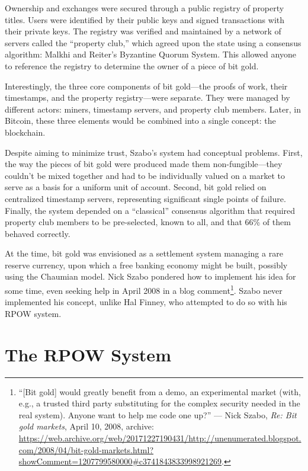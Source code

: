 \documentclass[
  a5paper,
  smalldemyvopaper,10pt,twoside,onecolumn,openright,extrafontsizes,hidelinks]{memoir}
\begin{document}
Ownership and exchanges were secured through a public registry of
property titles. Users were identified by their public keys and signed
transactions with their private keys. The registry was verified and
maintained by a network of servers called the ``property club,'' which
agreed upon the state using a consensus algorithm: Malkhi and Reiter's
Byzantine Quorum System. This allowed anyone to reference the registry
to determine the owner of a piece of bit gold.

Interestingly, the three core components of bit gold---the proofs of
work, their timestamps, and the property registry---were separate. They
were managed by different actors: miners, timestamp servers, and
property club members. Later, in Bitcoin, these three elements would be
combined into a single concept: the blockchain.

Despite aiming to minimize trust, Szabo's system had conceptual
problems. First, the way the pieces of bit gold were produced made them
non-fungible---they couldn't be mixed together and had to be
individually valued on a market to serve as a basis for a uniform unit
of account. Second, bit gold relied on centralized timestamp servers,
representing significant single points of failure. Finally, the system
depended on a ``classical'' consensus algorithm that required property
club members to be pre-selected, known to all, and that 66\% of them
behaved correctly.

At the time, bit gold was envisioned as a settlement system managing a
rare reserve currency, upon which a free banking economy might be built,
possibly using the Chaumian model. Nick Szabo pondered how to implement
his idea for some time, even seeking help in April 2008 in a blog
comment\footnote{``{[}Bit gold{]} would greatly benefit from a demo, an
  experimental market (with, e.g., a trusted third party substituting
  for the complex security needed in the real system). Anyone want to
  help me code one up?'' --- Nick Szabo, \emph{Re: Bit gold markets},
  April 10, 2008, archive:
  \url{https://web.archive.org/web/20171227190431/http://unenumerated.blogspot.com/2008/04/bit-gold-markets.html?showComment=1207799580000\#c3741843833998921269}.}.
Szabo never implemented his concept, unlike Hal Finney, who attempted to
do so with his RPOW system.

\section*{The RPOW System}\label{the-rpow-system}
\end{document}
